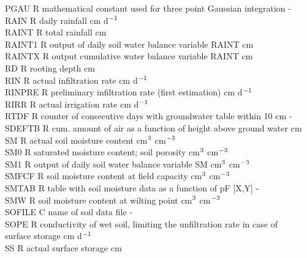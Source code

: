 \documentclass[11pt]{article}
\begin{document}
\begin{tabbing}
PGAU\> \> R\> mathematical constant used for three point Gaussian integration\> \> \> \> \> \> \> -\\
RAIN\> \> R\> daily rainfall\> \> \> \> \> \> \> cm d$^{{\rm -1}}$\\
RAINT\> \> R\> total rainfall\> \> \> \> \> \> \> cm\\
RAINT1\> \> R\> output of daily soil water balance variable RAINT\> \> \> \> \> \> \> cm\\
RAINTX\> \> R\> output cumulative water balance variable RAINT\> \> \> \> \> \> \> cm\\
RD\> \> R\> rooting depth\> \> \> \> \> \> \> cm\\
RIN\> \> R\> actual infiltration rate\> \> \> \> \> \> \> cm d$^{{\rm -1}}$\\
RINPRE\> \> R\> preliminary infiltration rate (first estimation)\> \> \> \> \> \> \> cm d$^{{\rm -1}}$\\
RIRR\> \> R\> actual irrigation rate\> \> \> \> \> \> \> cm d$^{{\rm -1}}$\\
RTDF\> \> R\> counter of consecutive days with groundwater table within 10 cm\> \> \> \> \> \> \> -\\
SDEFTB\> \> R\> cum. amount of air as a function of height above ground water\> \> \> \> \> \> \> cm \\
SM\> \> R\> actual soil moisture content\> \> \> \> \> \> \> cm$^{{\rm 3}}$ cm$^{{\rm -3}}$\\
SM0\> \> R\> saturated moisture content; soil porosity\> \> \> \> \> \> \> cm$^{{\rm 3}}$ cm$^{{\rm -3}}$\\
SM1\> \> R\> output of daily soil water balance variable SM\> \> \> \> \> \> \> cm$^{{\rm 3}}$ cm$^{{\rm -3}}$\\
SMFCF\> \> R\> soil moisture content at field capacity\> \> \> \> \> \> \> cm$^{{\rm 3}}$ cm$^{{\rm -3}}$\\
SMTAB\> \> R\> table with soil moisture data as a function of pF [X,Y]\> \> \> \> \> \> \> -\\
SMW\> \> R\> soil moisture content at wilting point\> \> \> \> \> \> \> cm$^{{\rm 3}}$ cm$^{{\rm -3}}$\\
SOFILE\> \> C\> name of soil data file\> \> \> \> \> \> \> -\\
SOPE\> \> R\> conductivity of wet soil, limiting the unfiltration rate in case of \\
\>\> \> surface storage \> \> \> \> \> \> \> cm d$^{{\rm -1}}$\\
SS\> \> R\> actual surface storage\> \> \> \> \> \> \> cm\\

\end{tabbing}
\end{document}
